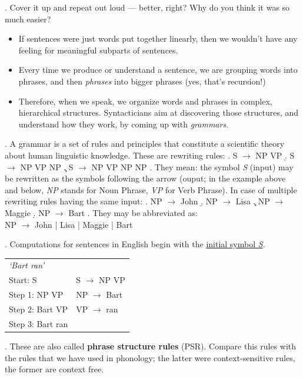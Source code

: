 \documentclass[11pt, oneside]{article}   	%
\begin{document}
\ex. Cover it up and repeat \LLast[b] out loud --- better, right? Why do you think it was so much easier?

\begin{itemize}
\item If sentences were just words put together linearly, then we wouldn't have any feeling for meaningful subparts of sentences.
\item Every time we produce or understand a sentence, we are grouping words into phrases, and then {\itshape phrases} into bigger phrases (yes, that's recursion!)
\item Therefore, when we speak, we organize words and phrases in complex, hierarchical structures. Syntacticians aim at discovering those structures, and understand how they work, by coming up with {\itshape grammars}.
\end{itemize}

\ex. A grammar is a set of rules and principles that constitute a scientific theory about human linguistic knowledge. These are rewriting rules:
	\a. S $\rightarrow$ NP VP
	\b. S $\rightarrow$ NP VP NP
	\c. S $\rightarrow$ NP VP NP NP
	\z.
They mean: the symbol {\itshape S} (input) may be rewritten as the symbols following the arrow (ouput; in the example above and below, {\itshape NP} stands for Noun Phrase, {\itshape VP} for Verb Phrase). In case of multiple rewriting rules having the same input:
	\a. NP $\rightarrow$ John
	\b. NP $\rightarrow$ Lisa 
	\c. NP $\rightarrow$ Maggie
	\d. NP $\rightarrow$ Bart
	\z.
They may be abbreviated as: \\ 
	NP $\rightarrow$ John | Lisa | Maggie | Bart  

\ex. Computations for sentences in English begin with the \underline{initial symbol {\itshape S}}. \\
\vspace{-1.5em}
\begin{center}
\begin{tabular}{l l}
{\itshape `Bart ran'}	&	\\
Start: S 		&	S $\rightarrow$ NP VP	\\ 
Step 1: NP  VP	&	NP $\rightarrow$ Bart \\
Step 2: Bart VP	&	VP $\rightarrow$ ran \\		
Step 3: Bart ran	&	 \\
\end{tabular}
\end{center}

\ex. These are also called {\bfseries phrase structure rules} (PSR). Compare this rules with the rules that we have used in phonology; the latter were context-sensitive rules, the former are context free. 
\end{document}
